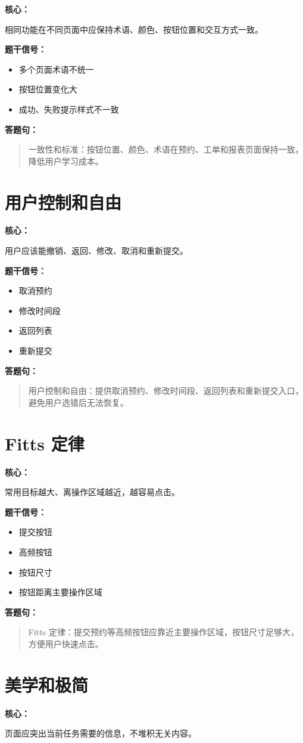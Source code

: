 \documentclass[UTF8,zihao=-4]{ctexart}
\newcommand{\principle}[1]{%
  \section*{\color{TitleBlue}#1}
}
\newcommand{\labeltext}[1]{%
  \textbf{#1}
}
\newenvironment{answerbox}{%
  \begin{quote}\small\color{TextGray}
}{%
  \end{quote}
}
\begin{document}
\labeltext{核心：}
相同功能在不同页面中应保持术语、颜色、按钮位置和交互方式一致。

\labeltext{题干信号：}
\begin{itemize}
  \item 多个页面术语不统一
  \item 按钮位置变化大
  \item 成功、失败提示样式不一致
\end{itemize}

\labeltext{答题句：}
\begin{answerbox}
一致性和标准：按钮位置、颜色、术语在预约、工单和报表页面保持一致，降低用户学习成本。
\end{answerbox}

\principle{用户控制和自由}

\labeltext{核心：}
用户应该能撤销、返回、修改、取消和重新提交。

\labeltext{题干信号：}
\begin{itemize}
  \item 取消预约
  \item 修改时间段
  \item 返回列表
  \item 重新提交
\end{itemize}

\labeltext{答题句：}
\begin{answerbox}
用户控制和自由：提供取消预约、修改时间段、返回列表和重新提交入口，避免用户选错后无法恢复。
\end{answerbox}

\principle{Fitts 定律}

\labeltext{核心：}
常用目标越大、离操作区域越近，越容易点击。

\labeltext{题干信号：}
\begin{itemize}
  \item 提交按钮
  \item 高频按钮
  \item 按钮尺寸
  \item 按钮距离主要操作区域
\end{itemize}

\labeltext{答题句：}
\begin{answerbox}
Fitts 定律：提交预约等高频按钮应靠近主要操作区域，按钮尺寸足够大，方便用户快速点击。
\end{answerbox}

\principle{美学和极简}

\labeltext{核心：}
页面应突出当前任务需要的信息，不堆积无关内容。
\end{document}
